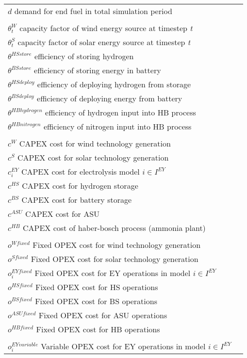 \documentclass[12 pt]{article}
\begin{document}
\begin{tabular}{ll}

$d$  demand for end fuel in total simulation period \\
\\
$\theta^{W}_{t}$ capacity factor of wind energy source at timestep \textit{t} \\
$\theta^{S}_{t}$ capacity factor of solar energy source at timestep \textit{t} \\
$\theta^{HS store}$ efficiency of storing hydrogen \\
$\theta^{BS store}$ efficiency of storing energy in battery \\
$\theta^{HS deploy}$ efficiency of deploying hydrogen from storage\\
$\theta^{BS deploy}$ efficiency of deploying energy from battery \\
$\theta^{HBhydrogen}$ efficiency of hydrogen input into HB process\\
$\theta^{HBnitrogen}$ efficiency of nitrogen input into HB process\\
\\
$c^{W}$ CAPEX cost for wind technology generation \\
$c^{S}$ CAPEX cost for solar technology generation \\
$c^{EY}_{i}$ CAPEX cost for electrolysis model $i \in I^{EY}$\\
$c^{HS}$ CAPEX cost for hydrogen storage\\
$c^{BS}$ CAPEX cost for battery storage\\
$c^{ASU}$ CAPEX cost for ASU\\
$c^{HB}$ CAPEX cost of haber-bosch process (ammonia plant)\\
\\
$o^{W fixed}$ Fixed OPEX cost for wind technology generation \\
$o^{S fixed}$ Fixed OPEX cost for solar  technology generation \\
$o^{EY fixed}_{i}$ Fixed OPEX cost for EY operations in model $i \in I^{EY}$\\
$o^{HS fixed}$ Fixed OPEX cost for HS operations \\
$o^{BS fixed}$ Fixed OPEX cost for BS operations \\
$o^{ASU fixed}$ Fixed OPEX cost for ASU operations \\
$o^{HB fixed}$ Fixed OPEX cost for HB operations \\
\\
$o^{EY variable}_{i}$ Variable OPEX cost for EY operations in model $i \in I^{EY}$\\

\end{tabular}
\end{document}
